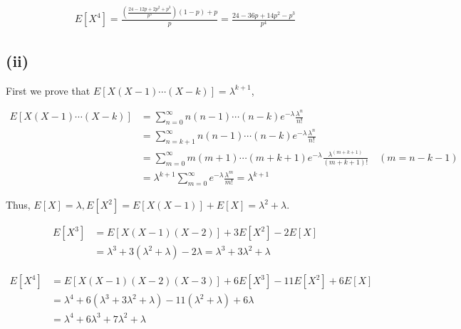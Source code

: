 \documentclass{article}
\begin{document}
\begin{equation}
    \begin{aligned}
        E[X^4] = \frac{(\frac{24-12p+2p^2+p^3}{p^3} )(1-p)+p}{p} = \frac {24-36p+14p^2 - p^3}{p^4}
    \end{aligned}
\end{equation}

\subsection{(ii)}

First we prove that $E[X(X-1) \cdots(X-k)]=\lambda^{k+1}$,

\begin{equation}
    \begin{aligned}
        E[X(X-1) \cdots(X-k)] & = \sum_{n=0}^{\infty} n(n-1)\cdots(n-k) e^{-\lambda} \frac {\lambda^n}{n!} \\
        & = \sum_{n=k+1}^{\infty} n(n-1)\cdots(n-k) e^{-\lambda} \frac {\lambda^n}{n!} \\
        & = \sum_{m=0}^{\infty} m(m+1)\cdots (m+k+1)  e^{-\lambda} \frac {\lambda^{(m+k+1)}}{(m+k+1)!}\quad (m = n-k-1) \\
        & = \lambda^{k+1}\sum_{m=0}^{\infty} e^{-\lambda} \frac {\lambda^m}{m!} = \lambda^{k+1}
    \end{aligned}
\end{equation}

Thus, $E[X] = \lambda,E[X^2] = E[X(X-1)]+E[X] = \lambda^2 + \lambda$.

\begin{equation}
    \begin{aligned}
        E[X^3] & = E[X(X-1)(X-2)] +3 E[X^2] - 2E[X] \\
        & = \lambda^3 + 3(\lambda^2 + \lambda) - 2 \lambda = \lambda^3 + 3\lambda^2  + \lambda
    \end{aligned}
\end{equation}


\begin{equation}
    \begin{aligned}
        E[X^4] & = E[X(X-1)(X-2)(X-3)] +6 E[X^3] - 11E[X^2] +6 E[X] \\
        & = \lambda^4 + 6(\lambda^3 + 3\lambda^2  + \lambda) -11 (\lambda^2 + \lambda) + 6 \lambda \\
        & = \lambda^4 + 6 \lambda^3 + 7 \lambda^2+ \lambda
    \end{aligned}
\end{equation}
\end{document}
